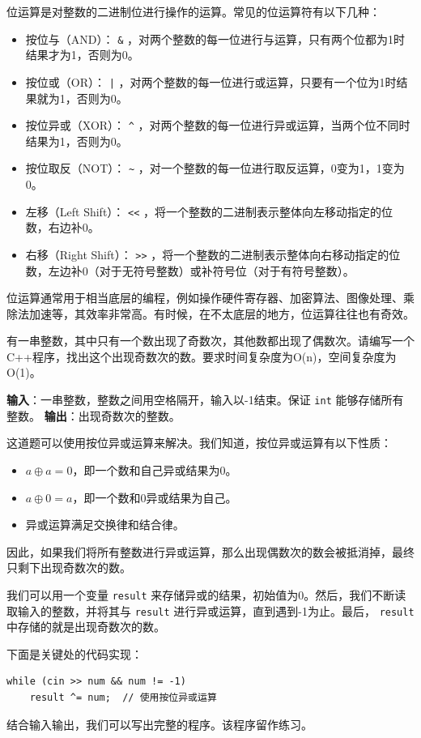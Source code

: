 位运算是对整数的二进制位进行操作的运算。常见的位运算符有以下几种：
\begin{itemize}
  \item 按位与（AND）： \texttt{\&} ，对两个整数的每一位进行与运算，只有两个位都为1时结果才为1，否则为0。
  \item 按位或（OR）： \texttt{|} ，对两个整数的每一位进行或运算，只要有一个位为1时结果就为1，否则为0。
  \item 按位异或（XOR）： \texttt{\textasciicircum} ，对两个整数的每一位进行异或运算，当两个位不同时结果为1，否则为0。
  \item 按位取反（NOT）： \texttt{\textasciitilde} ，对一个整数的每一位进行取反运算，0变为1，1变为0。
  \item 左移（Left Shift）： \texttt{<<} ，将一个整数的二进制表示整体向左移动指定的位数，右边补0。
  \item 右移（Right Shift）： \texttt{>>} ，将一个整数的二进制表示整体向右移动指定的位数，左边补0（对于无符号整数）或补符号位（对于有符号整数）。
\end{itemize}
位运算通常用于相当底层的编程，例如操作硬件寄存器、加密算法、图像处理、乘除法加速等，其效率非常高。有时候，在不太底层的地方，位运算往往也有奇效。
\begin{example}
  有一串整数，其中只有一个数出现了奇数次，其他数都出现了偶数次。请编写一个C++程序，找出这个出现奇数次的数。要求时间复杂度为O(n)，空间复杂度为O(1)。

  \textbf{输入}：一串整数，整数之间用空格隔开，输入以-1结束。保证 \texttt{int} 能够存储所有整数。
  \textbf{输出}：出现奇数次的整数。
\end{example}

\begin{answer}
  这道题可以使用按位异或运算来解决。我们知道，按位异或运算有以下性质：
  \begin{itemize}
    \item $a \oplus a = 0$，即一个数和自己异或结果为0。
    \item $a \oplus 0 = a$，即一个数和0异或结果为自己。
    \item 异或运算满足交换律和结合律。
  \end{itemize}
  因此，如果我们将所有整数进行异或运算，那么出现偶数次的数会被抵消掉，最终只剩下出现奇数次的数。

  我们可以用一个变量 \texttt{result} 来存储异或的结果，初始值为0。然后，我们不断读取输入的整数，并将其与 \texttt{result} 进行异或运算，直到遇到-1为止。最后， \texttt{result} 中存储的就是出现奇数次的数。

  下面是关键处的代码实现：
\begin{verbatim}
while (cin >> num && num != -1)
    result ^= num;  // 使用按位异或运算
\end{verbatim}
  结合输入输出，我们可以写出完整的程序。该程序留作练习。
\end{answer}

